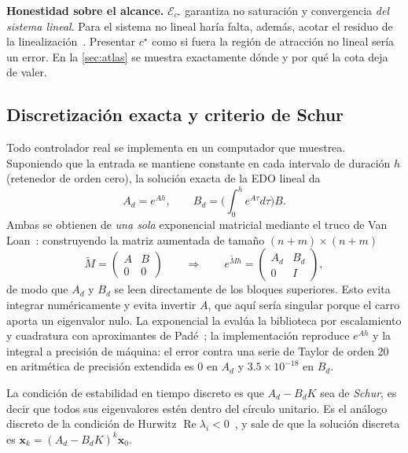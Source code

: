 \documentclass[11pt,letterpaper]{article}
\theoremstyle{definition}
\theoremstyle{plain}
\theoremstyle{remark}
\DeclareMathOperator{\Real}{Re}
\newcommand{\calE}{\mathcal{E}}
\newcommand{\xv}{\bm{x}}
\begin{document}
\begin{alerta}
\small
\textbf{Honestidad sobre el alcance.} $\calE_{c^\star}$ garantiza no saturación
y convergencia \emph{del sistema lineal}. Para el sistema no lineal haría falta,
además, acotar el residuo de la linealización~\cite{khalil2002}. Presentar
$c^\star$ como si fuera
la región de atracción no lineal sería un error. En la \cref{sec:atlas} se
muestra exactamente dónde y por qué la cota deja de valer.
\end{alerta}

\subsection{Discretización exacta y criterio de Schur}
\label{sec:zoh}

Todo controlador real se implementa en un computador que muestrea. Suponiendo
que la entrada se mantiene constante en cada intervalo de duración $h$
(retenedor de orden cero), la solución exacta de la EDO lineal da
\[
A_d=e^{Ah},\qquad B_d=\Big(\int_0^h e^{A\tau}d\tau\Big)B.
\]
Ambas se obtienen de \emph{una sola} exponencial matricial mediante el truco de
Van Loan~\cite{vanloan1978}: construyendo la matriz aumentada de tamaño
$(n+m)\times(n+m)$
\[
\widetilde M=\begin{pmatrix}A&B\\0&0\end{pmatrix}
\qquad\Longrightarrow\qquad
e^{\widetilde M h}=\begin{pmatrix}A_d&B_d\\0&I\end{pmatrix},
\]
de modo que $A_d$ y $B_d$ se leen directamente de los bloques superiores. Esto
evita integrar numéricamente y evita invertir $A$, que aquí sería singular
porque el carro aporta un eigenvalor nulo. La exponencial la evalúa la
biblioteca por escalamiento y cuadratura con aproximantes de
Padé~\cite[Alg.~9.3.1]{golub2013}; la implementación reproduce $e^{Ah}$ y la
integral a precisión de máquina: el error contra una serie de Taylor de orden 20
en aritmética de precisión extendida es $0$ en $A_d$ y $3.5\times10^{-18}$ en
$B_d$.

La condición de estabilidad en tiempo discreto es que $A_d-B_dK$ sea de
\emph{Schur}, es decir que todos sus eigenvalores estén dentro del círculo
unitario. Es el análogo discreto de la condición de Hurwitz
$\Real\lambda_i<0$~\cite[Thm.~10.16]{olver2018}, y sale de que la solución
discreta es $\xv_k=(A_d-B_dK)^k\xv_0$.
\end{document}
